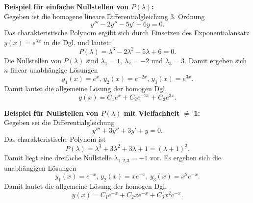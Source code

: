 \noindent
\textbf{Beispiel f\"ur einfache Nullstellen von $P(\lambda)$:}\\
Gegeben ist die homogene lineare Differentialgleichung 3. Ordnung
$$
y''' -2y''-5y'+6y =0.
$$
Das charakteristische Polynom ergibt sich durch Einsetzen des Exponentialansatz $y(x) = e^{\lambda x }$ in die Dgl. und lautet:
$$
P(\lambda) = \lambda^3 -2 \lambda^2 -5 \lambda +6 =0.
$$
Die Nullstellen von $P(\lambda)$ sind $\lambda_1 = 1$, $\lambda_2=-2$ und $\lambda_3 = 3$.
Damit ergeben sich $n$ linear unabh\"angige L\"osungen
$$
y_1(x) = e^x, \, y_2(x) = e^{-2x}, \, y_3(x)= e^{3x}.
$$
Damit lautet die allgemeine L\"osung der homogen Dgl.
$$
y(x) = C_1 e^{x} + C_2 e^{-2x} + C_3 e^{3x}.
$$

\noindent
\textbf{Beispiel f\"ur Nullstellen von $P(\lambda)$ mit Vielfachheit $\neq$ 1:}\\
Gegeben sei die Differentialgleichung
$$
y'''+3y''+3y'+y =0.
$$
Das charakteristische Polynom ist
$$
P(\lambda) =  \lambda^3 +3\lambda^2+3\lambda+1 = (\lambda+1)^3.
$$
Damit liegt eine dreifache Nullstelle $\lambda_{1,2,3} = -1$ vor. Es ergeben sich die unabh\"angigen L\"osungen
$$
y_1(x) = e^{-x}, \, y_2(x) = xe^{-x}, \, y_3(x)= x^2e^{-x}.
$$
Damit lautet die allgemeine L\"osung der homogen Dgl.
$$
y(x) = C_1 e^{-x} + C_2 xe^{-x} + C_3 x^2e^{-x}.
$$

